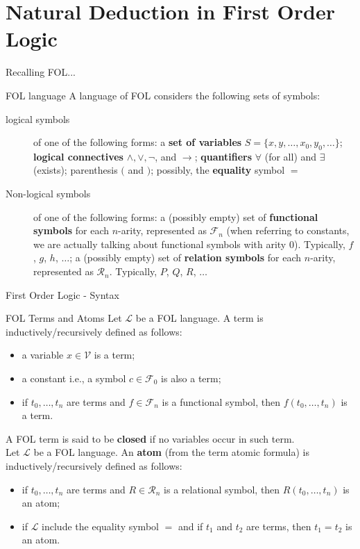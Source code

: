 \documentclass[aspectratio=169]{beamer}
\begin{document}
\frame[plain]{\titlepage}


\section{Natural Deduction in First Order Logic}

\begin{slide}{Recalling FOL...}

  \begin{block}{FOL language}  
    A language of FOL considers the following sets of symbols:
    \begin{description}
    \item [logical symbols] of one of the following forms: a \textbf{set of variables} $S = \{x,y,\ldots,x_0,y_0,\ldots\}$; \textbf{logical connectives} $\land, \lor, \neg$, and $\to$; \textbf{quantifiers} $\forall$ (for all) and $\exists$ (exists); parenthesis $($ and $)$; possibly, the \textbf{equality} symbol $=$
    \item [Non-logical symbols] of one of the following forms: a (possibly empty) set of \textbf{functional symbols} for each $n$-arity, represented as $\mathcal{F}_n$ (when referring to constants, we are actually talking about functional symbols with arity $0$). Typically, $f$, $g$, $h$, $\ldots$; a (possibly empty) set of \textbf{relation symbols} for each $n$-arity, represented as $\mathcal{R}_n$. Typically, $P$, $Q$, $R$, $\ldots$
    \end{description}
  \end{block}
\end{slide}

\begin{frame}[shrink=0.95]{First Order Logic - Syntax}
  \begin{block}{FOL Terms and Atoms}  
  Let $\mathcal{L}$ be a FOL language. A term is inductively/recursively defined as follows:
  \begin{itemize}
  \item a variable $x \in \mathcal{V}$ is a term;
  \item a constant i.e., a symbol $c \in \mathcal{F}_0$ is also a term;
  \item if $t_0,\ldots,t_n$ are terms and $f \in \mathcal{F}_n$ is a functional symbol, then $f(t_0,\ldots,t_n)$ is a term.  
  \end{itemize}
  A FOL term is said to be {\bf closed} if no variables occur in such term.\\
  \vspace{5pt}
  Let $\mathcal{L}$ be a FOL language. An {\bf atom} (from the term atomic formula) is inductively/recursively defined as follows:
  \begin{itemize}
  \item if $t_0,\ldots,t_n$ are terms and $R \in \mathcal{R}_n$ is a relational symbol, then $R(t_0,\ldots,t_n)$ is an atom;
  \item if $\mathcal{L}$ include the equality symbol $=$ and if $t_1$ and $t_2$ are terms, then $t_1 = t_2$ is an atom.  
  \end{itemize}
  \end{block}
\end{frame}
\end{document}
